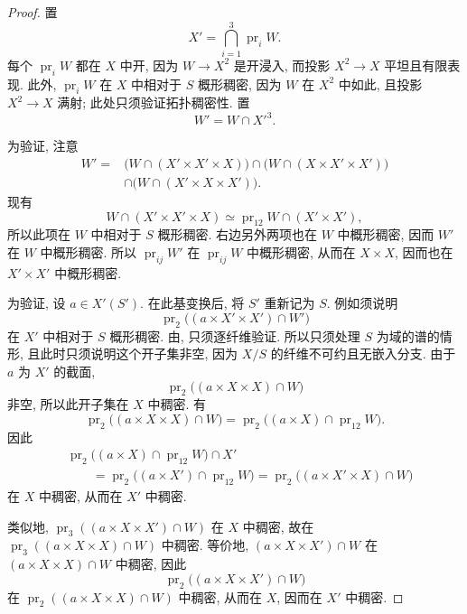 \begin{proof}
置
\[
  X'=\bigcap_{i=1}^{3}\operatorname{pr}_i W.
\]
每个 \(\operatorname{pr}_iW\) 都在 \(X\) 中开,
因为 \(W\to X^2\) 是开浸入, 而投影 \(X^2\to X\) 平坦且有限表现.
此外, \(\operatorname{pr}_iW\) 在 \(X\) 中相对于 \(S\) 概形稠密,
因为 \(W\) 在 \(X^2\) 中如此, 且投影 \(X^2\to X\) 满射;
此处只须验证拓扑稠密性. 置
\[
  W'=W\cap {X'}^3.
\]

为验证, 注意
\[
\begin{aligned}
  W'={}&
  \bigl(W\cap(X'\times X'\times X)\bigr)
  \cap\bigl(W\cap(X\times X'\times X')\bigr)\\
  &\cap\bigl(W\cap(X'\times X\times X')\bigr).
\end{aligned}
\]
现有
\[
  W\cap(X'\times X'\times X)
  \simeq \operatorname{pr}_{12}W\cap(X'\times X'),
\]
所以此项在 \(W\) 中相对于 \(S\) 概形稠密.
右边另外两项也在 \(W\) 中概形稠密, 因而 \(W'\) 在 \(W\) 中概形稠密.
所以 \(\operatorname{pr}_{ij}W'\) 在 \(\operatorname{pr}_{ij}W\) 中概形稠密,
从而在 \(X\times X\), 因而也在 \(X'\times X'\) 中概形稠密.

为验证, 设 \(a\in X'(S')\).
在此基变换后, 将 \(S'\) 重新记为 \(S\).
例如须说明
\[
  \operatorname{pr}_2\bigl((a\times X'\times X')\cap W'\bigr)
\]
在 \(X'\) 中相对于 \(S\) 概形稠密.
由, 只须逐纤维验证.
所以只须处理 \(S\) 为域的谱的情形,
且此时只须说明这个开子集非空,
因为 \(X/S\) 的纤维不可约且无嵌入分支.
由于 \(a\) 为 \(X'\) 的截面,
\[
  \operatorname{pr}_2\bigl((a\times X\times X)\cap W\bigr)
\]
非空, 所以此开子集在 \(X\) 中稠密. 有
\[
  \operatorname{pr}_2\bigl((a\times X\times X)\cap W\bigr)
  =
  \operatorname{pr}_2\bigl((a\times X)
    \cap\operatorname{pr}_{12}W\bigr).
\]
因此
\[
\begin{aligned}
  &\operatorname{pr}_2\bigl((a\times X)
    \cap\operatorname{pr}_{12}W\bigr)\cap X'\\
  &\qquad =
  \operatorname{pr}_2\bigl((a\times X')
    \cap\operatorname{pr}_{12}W\bigr)
  =
  \operatorname{pr}_2\bigl((a\times X'\times X)\cap W\bigr)
\end{aligned}
\]
在 \(X\) 中稠密, 从而在 \(X'\) 中稠密.

类似地, \(\operatorname{pr}_3((a\times X\times X')\cap W)\)
在 \(X\) 中稠密,
故在 \(\operatorname{pr}_3((a\times X\times X)\cap W)\) 中稠密.
等价地, \((a\times X\times X')\cap W\)
在 \((a\times X\times X)\cap W\) 中稠密, 因此
\[
  \operatorname{pr}_2\bigl((a\times X\times X')\cap W\bigr)
\]
在 \(\operatorname{pr}_2((a\times X\times X)\cap W)\) 中稠密,
从而在 \(X\), 因而在 \(X'\) 中稠密.


\end{proof}
